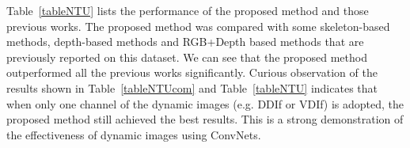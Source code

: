 \documentclass[letterpaper]{article} %
\begin{document}
Table~\ref{tableNTU} lists the performance of the proposed method and those
previous works.
The proposed method was compared with some skeleton-based methods,
depth-based methods and RGB+Depth based methods that are previously reported on this dataset. We can see that the
proposed method outperformed all the previous works significantly.
Curious observation of the results shown in Table~\ref{tableNTUcom}
and Table~\ref{tableNTU} indicates that when only one channel of the dynamic
images (e.g. DDIf or VDIf) is adopted, the proposed method still achieved the
best results. This is a strong demonstration of the effectiveness of dynamic
images using ConvNets.


\begin{table}[!ht]
\centering
\caption{Results and comparison on the SYSU 3D HOI Dataset using ConvNet and
c-ConvNet. \label{SYSUcom}}
\end{table}
\end{document}
